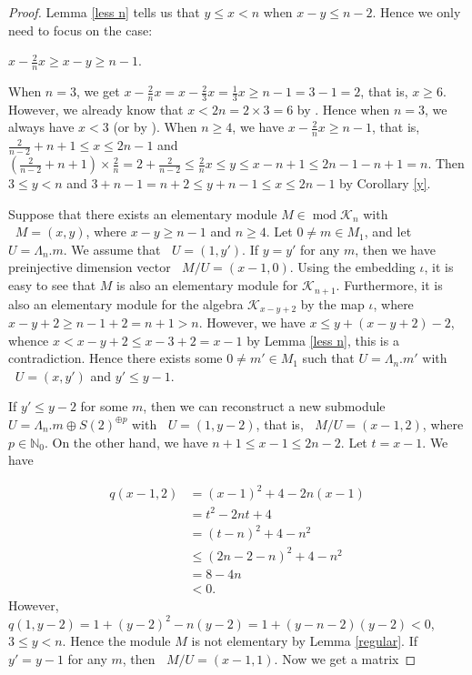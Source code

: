 \documentclass[a4paper,12pt]{amsart}
\newcommand{\cK}{\mathcal{K}}
\DeclareMathOperator{\modd}{mod}
\DeclareMathOperator{\dimu}{\underline{dim}}
\begin{document}
\begin{proof}
Lemma \ref{less n} tells us that  $y\leq x<n$ when $x-y\leq n-2$.  Hence we only need to focus on the case:
\begin{center}
$x-\frac{2}{n}x\geq x-y\geq n-1$.
\end{center} 
When $n=3$, we get $x-\frac{2}{n} x= x-\frac{2}{3} x=\frac{1}{3} x \geq n-1=3-1=2 $,  that is, $x\geq 6$. However, we already know that $x<2n=2\times 3=6$ by \cite[Lemma 3.6]{jie}. Hence when $n=3$, we always have $x<3$ (or by \cite[Section 1. Theorem]{Claus2}). When $n\geq 4$, we have $x-\frac{2}{n} x \geq n-1$, that is,  $\frac{2}{n-2}+n+1\leq x\leq 2n-1$ and  $(\frac{2}{n-2}+n+1)\times \frac{2}{n}=2+\frac{2}{n-2} \leq \frac{2}{n}x\leq  y\leq x- n+1\leq 2n-1-n+1=n$.  Then $ 3\leq y< n $ and $ 3+n-1=n+2  \leq y+n-1 \leq x \leq 2n-1$ by Corollary \ref{y}.



Suppose that there exists  an elementary module  $M\in \modd \cK_n$  with $\dimu M=(x,y)$, where $x-y\geq n-1$ and $n\geq 4$. Let $0\neq m\in M_1$, and let $U=\Lambda_n.m$.  We assume  that $\dimu U=(1,y')$. If $y=y'$ for any $m$, then we have preinjective dimension vector $\dimu M/U=(x-1,0)$. Using the embedding $\iota$, it is easy to see that $M$ is also an elementary module for $\cK_{n+1}$. Furthermore,  it is also an elementary module for the algebra $\cK_{x-y+2}$ by the map $\iota$, where $x-y+2\geq n-1+2=n+1>n$.  However, we have $x\leq y+(x-y+2)-2$,  whence $x<x-y+2\leq x-3+2=x-1$ by Lemma \ref{less n}, this is a contradiction. Hence there exists some $0\neq m'\in M_1$ such that $U=\Lambda_n.m'$ with $\dimu U=(x,y')$ and $y'\leq y-1$. 

 If $y'\leq y-2$ for some $m$,   then we can reconstruct a new submodule $U=\Lambda_n.m\oplus S(2)^{\oplus p}$  with $\dimu U=(1,y-2)$, that is,  $\dimu M/U=(x-1,2)$, where $p\in \mathbb{N}_0$. On the other hand,  we have $n+1\leq x-1\leq 2n-2$. Let $t=x-1$. We have 


\begin{equation}
\begin{split}
q(x-1,2)& =(x-1)^2+4 -2n(x-1)\\&=  t^2-2nt+4 \\&= (t-n)^2+4-n^2 \\& \leq (2n-2-n)^2+4-n^2\\&= 8-4n\\ & <0.
\end{split}
\end{equation}
However, $q(1,y-2)=1+(y-2)^2-n(y-2)=1+(y-n-2)(y-2)<0$, $3\leq y< n$. Hence the module $M$ is not elementary by Lemma \ref{regular}.     If   $y'=y-1$ for any $m$,  then $\dimu M/U=(x-1,1)$. Now we get a  matrix 



\end{proof}
\end{document}

